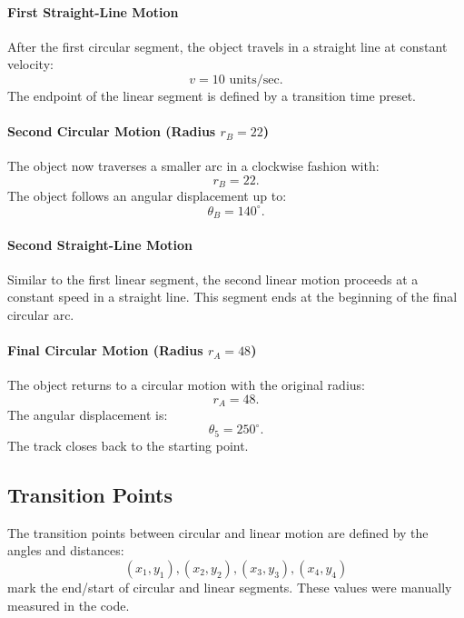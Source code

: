 \documentclass[a4paper,11pt]{article}
\begin{document}
\paragraph{First Straight-Line Motion}
After the first circular segment, the object travels in a straight line at constant velocity:
\begin{equation}
v = 10 \text{ units/sec}.
\end{equation}
The endpoint of the linear segment is defined by a transition time preset.

\paragraph{Second Circular Motion (Radius $r_B = 22$)}
The object now traverses a smaller arc in a clockwise fashion with:
\begin{equation}
r_B = 22.
\end{equation}
The object follows an angular displacement up to:
\begin{equation}
\theta_B = 140^\circ.
\end{equation}

\paragraph{Second Straight-Line Motion}
Similar to the first linear segment, the second linear motion proceeds at a constant speed in a straight line. This segment ends at the beginning of the final circular arc.

\paragraph{Final Circular Motion (Radius $r_A = 48$)}
The object returns to a circular motion with the original radius:
\begin{equation}
r_A = 48.
\end{equation}
The angular displacement is:
\begin{equation}
\theta_5 = 250^\circ.
\end{equation}
The track closes back to the starting point.

\subsection*{Transition Points}
The transition points between circular and linear motion are defined by the angles and distances:
\begin{equation}
(x_1, y_1), (x_2, y_2), (x_3, y_3), (x_4, y_4)
\end{equation}
mark the end/start of circular and linear segments. These values were manually measured in the code.
\end{document}
